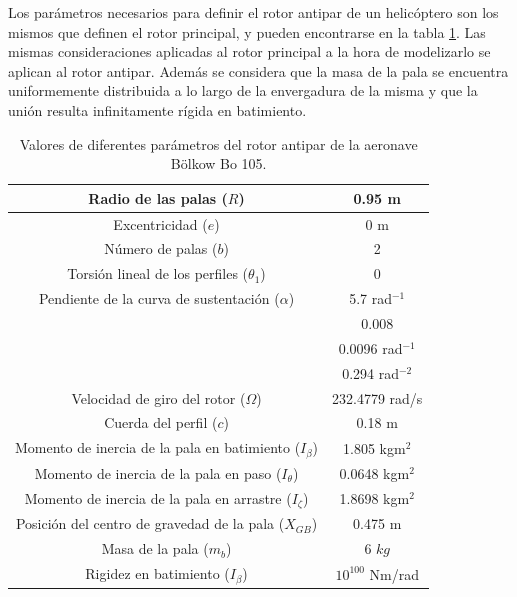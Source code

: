 Los parámetros necesarios para definir el rotor antipar de un helicóptero son los mismos que definen el rotor principal, y pueden encontrarse en la tabla \ref{RaBo}.
Las mismas consideraciones aplicadas al rotor principal a la hora de modelizarlo se aplican al rotor antipar. Además se considera que la masa de la pala se encuentra uniformemente distribuida a lo largo de la envergadura de la misma y que la unión resulta infinitamente rígida en batimiento.
\begin{table}[htbp]
	\centering
	\begin{tabular}{|>{\columncolor{Gray}}c|c|}
		\hline
		Radio de las palas ($R$) & 0.95 m \\ \hline
		Excentricidad ($e$) & 0 m \\ \hline
		Número de palas ($b$) & 2 \\ \hline
		Torsión lineal de los perfiles ($\theta_1$) & \cellcolor[rgb]{ 1,  1,  1}0 \\ \hline
		Pendiente de la curva de sustentación ($\alpha$) & 5.7 rad$^{-1}$ \\ \hline
		\cellcolor{Gray} & 0.008 \\ \cline{2-2}
		\cellcolor{Gray} & 0.0096 rad$^{-1}$ \\ \cline{2-2}
		\multirow{-3}{*}{\cellcolor{Gray}Parámetros de la polar ($\delta_0$, $\delta_1$, $\delta_2$)} & 0.294 rad$^{-2}$ \\ \hline
		Velocidad de giro del rotor ($\Omega$) & \cellcolor[rgb]{ 1,  1,  1}232.4779 rad/s \\ \hline
		Cuerda del perfil ($c$) & \cellcolor[rgb]{ 1,  1,  1}0.18 m \\ \hline
		Momento de inercia de la pala en batimiento ($I_\beta$) & 1.805 kgm$^2$ \\ \hline
		Momento de inercia de la pala en paso ($I_\theta$) & 0.0648 kgm$^2$ \\ \hline
		Momento de inercia de la pala en arrastre ($I_\zeta$) & 1.8698 kgm$^2$ \\ \hline
		Posición del centro de gravedad de la pala ($X_{GB}$) & 0.475 m \\ \hline
		Masa de la pala ($m_b$) & 6 $kg$ \\ \hline
		\cellcolor{Gray}Rigidez en batimiento ($I_\beta$) & $10^{100}$ Nm/rad \\ \hline
	\end{tabular}%
	\caption{Valores de diferentes parámetros del rotor antipar de la aeronave Bölkow Bo 105.}
	\label{RaBo}
\end{table}%

